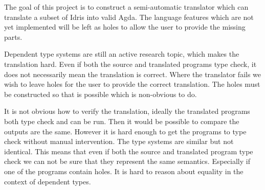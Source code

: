 \documentclass[parskip=half]{scrartcl}
\begin{document}
The goal of this project is to construct a semi-automatic translator which can
translate a subset of Idris into valid Agda. The language features which are
not yet implemented will be left as holes to allow the user to provide the
missing parts.



Dependent type systems are still an active research topic, which makes the
translation hard.
Even if both the source and translated programs type check, it does not
necessarily mean the translation is correct.  Where the translator fails we
wish to leave holes for the user to provide the correct translation. The holes
must be constructed so that is possible which is non-obvious to do.

It is not obvious how to verify the translation, ideally the translated
programs both type check and can be run. Then it would be possible to compare
the outputs are the same. However it is hard enough to get the programs to type
check without manual intervention. The type systems are similar but not
identical. This means that even if both the source and translated program
type check we can not be sure that they represent the same semantics.
Especially if one of the programs contain holes. It is hard to reason about
equality in the context of dependent types.
\end{document}
